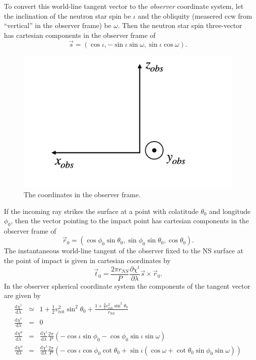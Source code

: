\documentclass[modern]{aastex631}
\newcommand{\rNS}{r_\mathrm{NS}}
\newcommand{\vRot}{v_\mathrm{rot}}
\begin{document}
To convert this world-line tangent vector to the \emph{observer} coordinate
system, let the inclination of the neutron star spin be $\iota$ and the
obliquity (measered ccw from ``vertical'' in the observer frame) be $\omega$.
Then the neutron star spin three-vector has cartesian components in the observer
frame of 
\begin{equation}
    \vec{s} = \left( \cos \iota, -\sin \iota \sin \omega, \sin \iota \cos \omega \right).
\end{equation}
\begin{figure}
    \centering
        \includegraphics[width=0.9\columnwidth]{obs_cart_coord.png}
        \caption{The coordinates in the observer frame.}
        \label{fig:testsim}
    \end{figure}
If the incoming ray strikes the surface at a point with colatitude $\theta_0$
and longitude $\phi_0$, then the vector pointing to the impact point has
cartesian components in the observer frame of 
\begin{equation}
    \vec{r}_0 = \left( \cos \phi_0 \sin \theta_0, \sin\phi_0 \sin \theta_0, \cos \theta_0 \right).
\end{equation}
The instantaneous world-line tangent of the observer fixed to the NS surface at
the point of impact is given in cartesian coordinates by 
\begin{equation}
    \vec{t}_0 = \frac{2 \pi r_{NS}}{P} \frac{\partial \chi^t}{\partial \lambda} \vec{s} \times \vec{r}_0. 
\end{equation}
In the observer spherical coordinate system the components of the tangent vector
are given by 
\begin{eqnarray}
    \frac{\mathrm{d}\chi^t}{\mathrm{d} \lambda} & \simeq & 1 + \frac{1}{2}  \vRot^2 \sin^2 \theta_0 + \frac{1 + \frac{3}{2} \vRot^2 \sin^2 \theta_0}{\rNS} \\
    \frac{\mathrm{d} \chi^r}{\mathrm{d} \lambda} & = & 0 \\
    \frac{\mathrm{d} \chi^\theta}{\mathrm{d} \lambda} & = & \frac{\mathrm{d} \chi^t}{\mathrm{d}\lambda} \frac{2\pi}{P} \left( - \cos\iota \sin \phi_0 - \cos\phi_0 \sin \iota \sin \omega \right) \\
    \frac{\mathrm{d} \chi^\phi}{\mathrm{d} \lambda} & = & \frac{\mathrm{d} \chi^t}{\mathrm{d}\lambda} \frac{2\pi}{P} \left( -\cos\iota \cos \phi_0 \cot \theta_0  + \sin \iota \left( \cos \omega + \cot \theta_0 \sin \phi_0 \sin \omega \right) \right)
\end{eqnarray}
\end{document}
